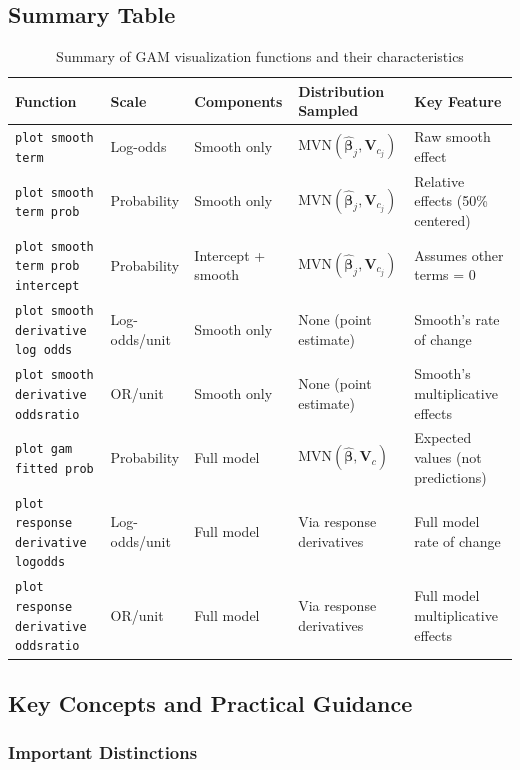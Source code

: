 \documentclass[12pt]{article}
\begin{document}
\subsection{Summary Table}
\begin{table}[htbp]
\centering
\caption{Summary of GAM visualization functions and their characteristics}
\label{tab:gam_functions}
\small
\begin{tabularx}{\linewidth}{>{\RaggedRight}p{3.5cm} >{\RaggedRight}X >{\RaggedRight}X >{\RaggedRight}X >{\RaggedRight}X}
\toprule
\textbf{Function} & \textbf{Scale} & \textbf{Components} & \textbf{Distribution Sampled} & \textbf{Key Feature} \\
\midrule
\texttt{plot smooth term} & Log-odds & Smooth only & $\text{MVN}(\hat{\boldsymbol{\beta}}_j, \mathbf{V}_{c_j})$ & Raw smooth effect \\
\texttt{plot smooth term prob} & Probability & Smooth only & $\text{MVN}(\hat{\boldsymbol{\beta}}_j, \mathbf{V}_{c_j})$ & Relative effects (50\% centered) \\
\texttt{plot smooth term prob intercept} & Probability & Intercept + smooth & $\text{MVN}(\hat{\boldsymbol{\beta}}_j, \mathbf{V}_{c_j})$ & Assumes other terms = 0 \\
\texttt{plot smooth derivative log odds} & Log-odds/unit & Smooth only & None (point estimate) & Smooth's rate of change \\
\texttt{plot smooth derivative oddsratio} & OR/unit & Smooth only & None (point estimate) & Smooth's multiplicative effects \\
\texttt{plot gam fitted prob} & Probability & Full model & $\text{MVN}(\hat{\boldsymbol{\beta}}, \mathbf{V}_c)$ & Expected values (not predictions) \\
\texttt{plot response derivative logodds} & Log-odds/unit & Full model & Via response derivatives & Full model rate of change \\
\texttt{plot response derivative oddsratio} & OR/unit & Full model & Via response derivatives & Full model multiplicative effects \\
\bottomrule
\end{tabularx}
\end{table}

\subsection{Key Concepts and Practical Guidance}

\subsubsection{Important Distinctions}
\end{document}
